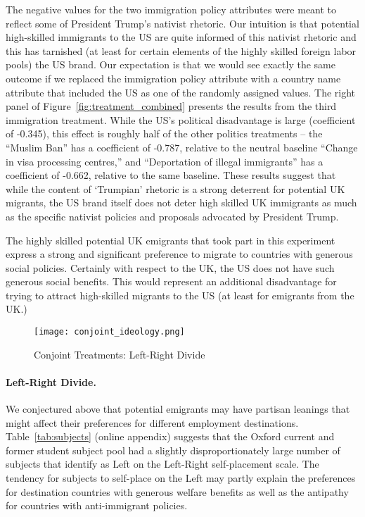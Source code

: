\documentclass[12pt]{article}
\begin{document}
\par The negative values for the two immigration policy attributes were meant to reflect some of President Trump's nativist rhetoric. Our intuition is that potential high-skilled immigrants to the US are quite informed of this nativist rhetoric and this has tarnished (at least for certain elements of the highly skilled foreign labor pools) the US brand. Our expectation is that we would see exactly the same outcome if we replaced the immigration policy attribute with a country name attribute that included the US as one of the randomly assigned values. The right panel of Figure~\ref{fig:treatment_combined} presents the results from the third immigration treatment.  While the US's political disadvantage is large (coefficient of -0.345), this effect is roughly half of the other politics treatments -- the ``Muslim Ban'' has a coefficient of -0.787, relative to the neutral baseline ``Change in visa processing centres,'' and ``Deportation of illegal immigrants'' has a coefficient of -0.662, relative to the same baseline. These results suggest that while the content of `Trumpian' rhetoric is a strong deterrent for potential UK migrants, the US brand itself does not deter high skilled UK immigrants as much as the specific nativist policies and proposals advocated by President Trump. 



\par The highly skilled potential UK emigrants that took part in this experiment express a strong and significant preference to migrate to countries with generous social policies.  Certainly with respect to the UK, the US does not have such generous social benefits.  This would represent an additional disadvantage for trying to attract high-skilled migrants to the US (at least for emigrants from the UK.)


\begin{figure}%
\caption{Conjoint Treatments: Left-Right Divide}\label{fig:conjoint_ideology}
\centerline{\texttt{[image: conjoint\_ideology.png]}}
\end{figure}

\paragraph{Left-Right Divide.}  We conjectured above that potential emigrants may have partisan leanings that might affect their preferences for different employment destinations. Table~\ref{tab:subjects} (online appendix) suggests that the Oxford current and former student subject pool had a slightly disproportionately large number of subjects that identify as Left on the Left-Right self-placement scale. The tendency for subjects to self-place on the Left may partly explain the preferences for destination countries with generous welfare benefits as well as the antipathy for countries with anti-immigrant policies.
\end{document}
